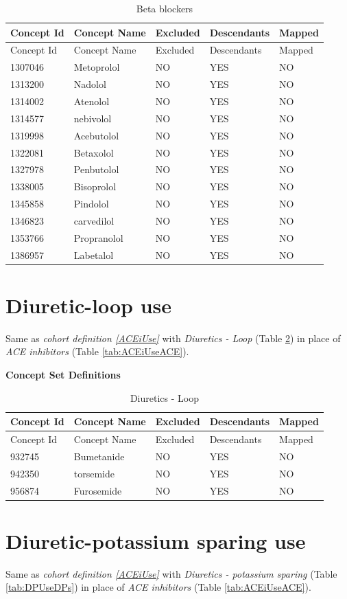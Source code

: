 \documentclass[11pt]{book}
\theoremstyle{definition}
\theoremstyle{definition}
\theoremstyle{definition}
\theoremstyle{remark}
\begin{document}
\begin{longtable}[]{@{}lllll@{}}
\caption{\label{tab:BBUseBB} Beta blockers}\tabularnewline
\toprule
Concept Id & Concept Name & Excluded & Descendants & Mapped\tabularnewline
\midrule
\endfirsthead
\toprule
Concept Id & Concept Name & Excluded & Descendants & Mapped\tabularnewline
\midrule
\endhead
1307046 & Metoprolol & NO & YES & NO\tabularnewline
1313200 & Nadolol & NO & YES & NO\tabularnewline
1314002 & Atenolol & NO & YES & NO\tabularnewline
1314577 & nebivolol & NO & YES & NO\tabularnewline
1319998 & Acebutolol & NO & YES & NO\tabularnewline
1322081 & Betaxolol & NO & YES & NO\tabularnewline
1327978 & Penbutolol & NO & YES & NO\tabularnewline
1338005 & Bisoprolol & NO & YES & NO\tabularnewline
1345858 & Pindolol & NO & YES & NO\tabularnewline
1346823 & carvedilol & NO & YES & NO\tabularnewline
1353766 & Propranolol & NO & YES & NO\tabularnewline
1386957 & Labetalol & NO & YES & NO\tabularnewline
\bottomrule
\end{longtable}

\hypertarget{DLoopUse}{%
\section{Diuretic-loop use}\label{DLoopUse}}

Same as \emph{cohort definition \ref{ACEiUse}} with \emph{Diuretics - Loop} (Table \ref{tab:DLoopUseDLoops}) in place of \emph{ACE inhibitors} (Table \ref{tab:ACEiUseACE}).

\textbf{Concept Set Definitions}

\begin{longtable}[]{@{}lllll@{}}
\caption{\label{tab:DLoopUseDLoops} Diuretics - Loop}\tabularnewline
\toprule
Concept Id & Concept Name & Excluded & Descendants & Mapped\tabularnewline
\midrule
\endfirsthead
\toprule
Concept Id & Concept Name & Excluded & Descendants & Mapped\tabularnewline
\midrule
\endhead
932745 & Bumetanide & NO & YES & NO\tabularnewline
942350 & torsemide & NO & YES & NO\tabularnewline
956874 & Furosemide & NO & YES & NO\tabularnewline
\bottomrule
\end{longtable}

\hypertarget{DPUse}{%
\section{Diuretic-potassium sparing use}\label{DPUse}}

Same as \emph{cohort definition \ref{ACEiUse}} with \emph{Diuretics - potassium sparing} (Table \ref{tab:DPUseDPs}) in place of \emph{ACE inhibitors} (Table \ref{tab:ACEiUseACE}).
\end{document}
